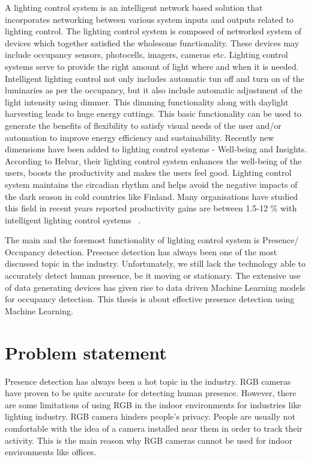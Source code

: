A lighting control system is an intelligent network based solution that incorporates networking between various system inputs and outputs related to lighting control. The lighting control system is composed of networked system of devices which together satisfied the wholesome functionality. These devices may include occupancy sensors, photocells, imagers, cameras etc.  Lighting control systems serve to provide the right amount of light where and when it is needed. Intelligent lighting control not only includes automatic tun off and turn on of the luminaries as per the occupancy, but it also include automatic adjustment of the light intensity using dimmer. This dimming functionality along with daylight harvesting leads to huge energy cuttings. This basic functionality can be used to generate the benefits of flexibility to satisfy visual needs of the user and/or automation to improve energy efficiency and sustainability. Recently new dimensions have been added to lighting control systems - Well-being and Insights. 
According to Helvar, their lighting control system enhances the well-being of the users, boosts the productivity and makes the users feel good. Lighting control system maintains the circadian rhythm and helps avoid the negative impacts of the dark season in cold countries like Finland. Many organisations have studied this field in recent years reported productivity gains are between 1.5-12 \% with intelligent lighting control systems ~\cite{helvar_wellbeing}.


The main and the foremost functionality of lighting control system is Presence/ Occupancy detection. Presence detection has always been one of the most discussed topic in the industry. Unfortunately, we still lack the technology able to accurately detect human presence, be it moving or stationary. The extensive use of data generating devices has given rise to data driven Machine Learning models for occupancy detection. This thesis is about effective presence detection using Machine Learning.

\section{Problem statement}

Presence detection has always been a hot topic in the industry. RGB cameras have proven to be quite accurate for detecting human presence. However, there are some limitations of using RGB in the indoor environments for industries like lighting industry. RGB camera hinders people's privacy. People are usually not comfortable with the idea of a camera installed near them in order to track their activity. This is the main reason why RGB cameras cannot be used for indoor environments like offices.

